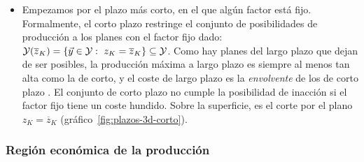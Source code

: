 \documentclass[11pt]{article}
\begin{document}
\begin{itemize}
\item Empezamos por el plazo más corto, en el que algún factor está fijo. Formalmente, el corto plazo restringe el conjunto de posibilidades de producción a los planes con el factor fijo dado: $\mathcal{Y}(\overline{z}_K)=\{\vect{y}\in\mathcal{Y}:\ z_K=\overline{z}_K\}\subseteq\mathcal{Y}$. Como hay planes del largo plazo que dejan de ser posibles, la producción máxima a largo plazo es siempre al menos tan alta como la de corto, y el coste de largo plazo es la \emph{envolvente} de los de corto plazo . El conjunto de corto plazo no cumple la posibilidad de inacción si el factor fijo tiene un coste hundido\nocite{MasColellWhinstonGreen1995}. Sobre la superficie, es el corte por el plano $z_K=\overline{z}_K$ (gráfico~\ref{fig:plazos-3d-corto}).
\end{itemize}

\subsubsection{Región económica de la producción}\label{sec:region-economica-produccion}
\end{document}

